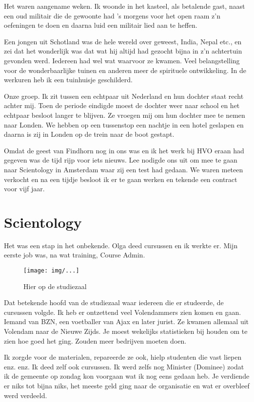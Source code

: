 \documentclass[10pt,twoside,openright]{memoir}
\begin{document}
Het waren aangename weken. Ik woonde in het kasteel, als betalende gast, naast een oud militair die de gewoonte had ’s morgens voor het open raam z’n oefeningen te doen en daarna luid een militair lied aan te heffen. 

Een jongen uit Schotland was de hele wereld over geweest, India, Nepal etc., en zei dat het wonderlijk was dat wat hij altijd had gezocht bijna in z’n achtertuin gevonden werd. Iedereen had wel wat waarvoor ze kwamen. Veel belangstelling voor de wonderbaarlijke tuinen en anderen meer de spirituele ontwikkeling. In de werkuren heb ik een tuinhuisje geschilderd. 

Onze groep. Ik zit tussen een echtpaar uit Nederland en hun dochter staat recht achter mij. Toen de periode eindigde moest de dochter weer naar school en het echtpaar besloot langer te blijven. Ze vroegen mij om hun dochter mee te nemen naar Londen. We hebben op een tussenstop een nachtje in een hotel geslapen en daarna is zij in Londen op de trein naar de boot gestapt.

Omdat de geest van Findhorn nog in ons was en ik het werk bij HVO eraan had gegeven was de tijd rijp voor iets nieuws. Lee nodigde ons uit om mee te gaan naar Scientology in Amsterdam waar zij een test had gedaan. We waren meteen verkocht en na een tijdje besloot ik er te gaan werken en tekende een contract voor vijf jaar. 

\chapter{Scientology} %
\label{cha:scientologu}

Het was een stap in het onbekende. Olga deed cursussen en ik werkte er. Mijn eerste job was, na wat training, Course Admin. 

\begin{figure}[t]
\texttt{[image: img/...]}
\caption{Hier op de studiezaal}
\end{figure}

Dat betekende hoofd van de studiezaal waar iedereen die er studeerde, de cursussen volgde. Ik heb er ontzettend veel Volendammers zien komen en gaan. Iemand van BZN, een voetballer van Ajax en later jurist. Ze kwamen allemaal uit Volendam naar de Nieuwe Zijds. Je moest wekelijks statistieken bij houden om te zien hoe goed het ging. Zouden meer bedrijven moeten doen.

Ik zorgde voor de materialen, repareerde ze ook, hielp studenten die vast liepen enz. enz. Ik deed zelf ook cursussen. Ik werd zelfs nog Minister (Dominee) zodat ik de gemeente op zondag kon voorgaan wat ik nog eens gedaan heb. Je verdiende er niks tot bijna niks, het meeste geld ging naar de organisatie en wat er overbleef werd verdeeld. 
\end{document}
